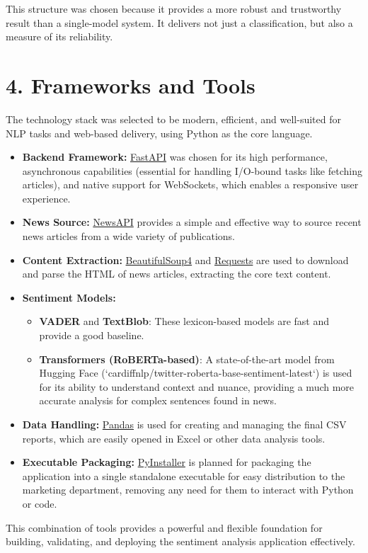 \documentclass[11pt,a4paper]{article}
\begin{document}
This structure was chosen because it provides a more robust and trustworthy result than a single-model system. It delivers not just a classification, but also a measure of its reliability.

\section*{4. Frameworks and Tools}
The technology stack was selected to be modern, efficient, and well-suited for NLP tasks and web-based delivery, using Python as the core language.
\begin{itemize}
    \item \textbf{Backend Framework:} \href{https://fastapi.tiangolo.com/}{FastAPI} was chosen for its high performance, asynchronous capabilities (essential for handling I/O-bound tasks like fetching articles), and native support for WebSockets, which enables a responsive user experience.
    \item \textbf{News Source:} \href{https://newsapi.org/}{NewsAPI} provides a simple and effective way to source recent news articles from a wide variety of publications.
    \item \textbf{Content Extraction:} \href{https://www.crummy.com/software/BeautifulSoup/bs4/doc/}{BeautifulSoup4} and \href{https://requests.readthedocs.io/en/latest/}{Requests} are used to download and parse the HTML of news articles, extracting the core text content.
    \item \textbf{Sentiment Models:}
        \begin{itemize}
            \item \textbf{VADER} and \textbf{TextBlob}: These lexicon-based models are fast and provide a good baseline.
            \item \textbf{Transformers (RoBERTa-based)}: A state-of-the-art model from Hugging Face (`cardiffnlp/twitter-roberta-base-sentiment-latest`) is used for its ability to understand context and nuance, providing a much more accurate analysis for complex sentences found in news.
        \end{itemize}
    \item \textbf{Data Handling:} \href{https://pandas.pydata.org/}{Pandas} is used for creating and managing the final CSV reports, which are easily opened in Excel or other data analysis tools.
    \item \textbf{Executable Packaging:} \href{https://www.pyinstaller.org/}{PyInstaller} is planned for packaging the application into a single standalone executable for easy distribution to the marketing department, removing any need for them to interact with Python or code.
\end{itemize}
This combination of tools provides a powerful and flexible foundation for building, validating, and deploying the sentiment analysis application effectively.
\end{document}
